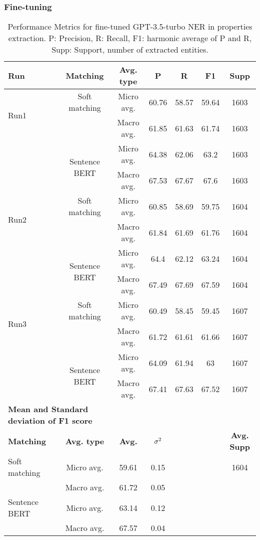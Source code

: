 \clearpage

\subsubsection{Fine-tuning}

\begin{table}[htbp]
\small
  \centering
  \caption{Performance Metrics for fine-tuned GPT-3.5-turbo NER in properties extraction. P: Precision, R: Recall, F1: harmonic average of P and R, Supp: Support, number of extracted entities.}
  \begin{tabular}{lcccccc}
    \toprule
    \textbf{Run} & \textbf{Matching} & \textbf{Avg. type} & \textbf{P} & \textbf{R} & \textbf{F1} & \textbf{Supp} \\
    \midrule
    \multirow{2}{*}{Run1} & Soft matching & Micro avg. & 60.76 & 58.57 & 59.64 & 1603 \\
    & & Macro avg. & 61.85 & 61.63 & 61.74 & 1603 \\
    \cmidrule{2-7}
    & \multirow{2}{*}{Sentence BERT} & Micro avg. & 64.38 & 62.06 & 63.2 & 1603 \\
    & & Macro avg. & 67.53 & 67.67 & 67.6 & 1603 \\
    \midrule
    \multirow{2}{*}{Run2} & Soft matching & Micro avg. & 60.85 & 58.69 & 59.75 & 1604 \\
    & & Macro avg. & 61.84 & 61.69 & 61.76 & 1604 \\
    \cmidrule{2-7}
    & \multirow{2}{*}{Sentence BERT} & Micro avg. & 64.4 & 62.12 & 63.24 & 1604 \\
    & & Macro avg. & 67.49 & 67.69 & 67.59 & 1604 \\
    \midrule
    \multirow{2}{*}{Run3} & Soft matching & Micro avg. & 60.49 & 58.45 & 59.45 & 1607 \\
    & & Macro avg. & 61.72 & 61.61 & 61.66 & 1607 \\
    \cmidrule{2-7}
    & \multirow{2}{*}{Sentence BERT} & Micro avg. & 64.09 & 61.94 & 63 & 1607 \\
    & & Macro avg. & 67.41 & 67.63 & 67.52 & 1607 \\
    \midrule
    \multicolumn{2}{l}{\textbf{Mean and Standard deviation of F1 score}} & & & & & \\
    \midrule
    \textbf{Matching} & \textbf{Avg. type} & \textbf{Avg.} & $\sigma\textsuperscript{2}$ & & & \textbf{Avg. Supp}\\
    Soft matching & Micro avg. & 59.61 & 0.15 & & & 1604 \\
    & Macro avg. & 61.72 & 0.05 & & & \\
    Sentence BERT & Micro avg. & 63.14 & 0.12 & & & \\
    & Macro avg. & 67.57 & 0.04 & & & \\
    \bottomrule
  \end{tabular}
\end{table}

